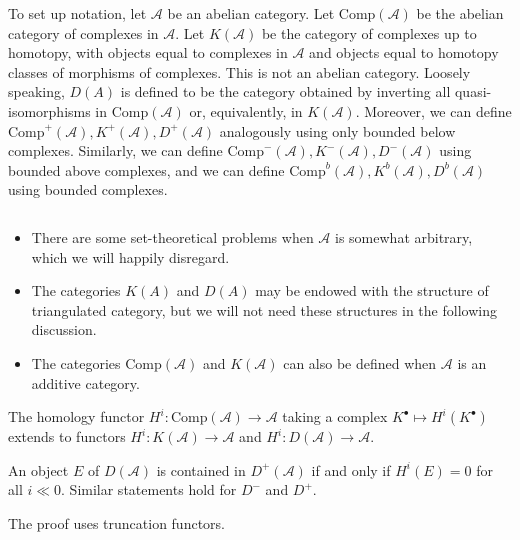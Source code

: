 To set up notation, let $\mathcal{A}$ be an abelian category. Let $\text{Comp}(\mathcal{A})$ be the abelian category of complexes in $\mathcal{A}$.  Let $K(\mathcal{A})$ be the category of complexes up to homotopy, with objects equal to complexes in $\mathcal{A}$ and objects equal to homotopy classes of morphisms of complexes. This is not an abelian category. Loosely speaking, $D(A)$ is defined to be the category obtained by inverting all quasi-isomorphisms in $\text{Comp}(\mathcal{A})$ or, equivalently, in $K(\mathcal{A})$.  Moreover, we can define $\text{Comp}^+(\mathcal{A}), K^+(\mathcal{A}), D^+(\mathcal{A})$ analogously using only bounded below complexes.  Similarly, we can define $\text{Comp}^-(\mathcal{A}), K^-(\mathcal{A}), D^-(\mathcal{A})$ using bounded above complexes, and we can define $\text{Comp}^b(\mathcal{A}), K^b(\mathcal{A}), D^b(\mathcal{A})$ using bounded complexes.

\begin{remark} $ $
\begin{itemize}
\item
There are some set-theoretical problems when $\mathcal{A}$ is somewhat arbitrary, which we will happily disregard.
\item
The categories $K(A)$ and $D(A)$ may be endowed with the structure of triangulated category, but we will not need these structures in the following discussion. 
\item
The categories $\text{Comp}(\mathcal{A})$ and $K(\mathcal{A})$ can also be defined when $\mathcal{A}$ is an additive category.
\end{itemize}
\end{remark}

The homology functor $H^i: \text{Comp}(\mathcal{A}) \to \mathcal{A}$ taking a complex $K^\bullet \mapsto H^i(K^\bullet)$ extends to functors $H^i: K(\mathcal{A}) \to \mathcal{A}$ and $H^i: D(\mathcal{A}) \to \mathcal{A}$.

\begin{lemma}
An object $E$ of $D(\mathcal{A})$ is contained in $D^+(\mathcal{A})$ if and only if $H^i(E) =0 $ for all $i \ll 0$.  Similar statements hold for $D^-$ and $D^+$.
\end{lemma}

The proof uses truncation functors.

